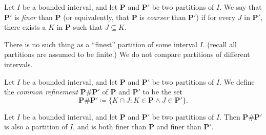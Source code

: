 \begin{definition}\label{11.1.14}
    Let \(I\) be a bounded interval, and let \(\mathbf{P}\) and \(\mathbf{P}'\) be two partitions of \(I\).
    We say that \(\mathbf{P}'\) is \emph{finer} than \(\mathbf{P}\) (or equivalently, that \(\mathbf{P}\) is \emph{coarser} than \(\mathbf{P}'\)) if for every \(J\) in \(\mathbf{P}'\), there exists a \(K\) in \(\mathbf{P}\) such that \(J \subseteq K\).
\end{definition}

\begin{note}
    There is no such thing as a ``finest'' partition of some interval \(I\).
    (recall all partitions are assumed to be finite.)
    We do not compare partitions of different intervals.
\end{note}

\setcounter{theorem}{15}
\begin{definition}\label{11.1.16}
    Let \(I\) be a bounded interval, and let \(\mathbf{P}\) and \(\mathbf{P}'\) be two partitions of \(I\).
    We define the \emph{common refinement} \(\mathbf{P} \# \mathbf{P}'\) of \(\mathbf{P}\) and \(\mathbf{P}'\) to be the set
    \[
        \mathbf{P} \# \mathbf{P}' \coloneqq \{K \cap J : K \in \mathbf{P} \land J \in \mathbf{P}'\}.
    \]
\end{definition}

\setcounter{theorem}{17}
\begin{lemma}\label{11.1.18}
    Let \(I\) be a bounded interval, and let \(\mathbf{P}\) and \(\mathbf{P}'\) be two partitions of \(I\).
    Then \(\mathbf{P} \# \mathbf{P}'\) is also a partition of \(I\), and is both finer than \(\mathbf{P}\) and finer than \(\mathbf{P}'\).
\end{lemma}


